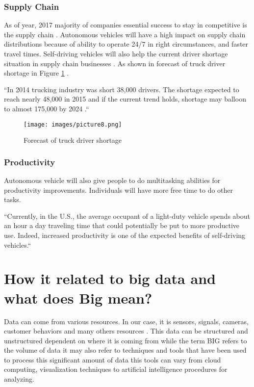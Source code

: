 \documentclass[sigconf]{acmart}
\begin{document}
\subsubsection{Supply Chain} As of year, 2017 majority of companies essential success to stay in competitive is the supply chain \cite{ATA}.  Autonomous vehicles will have a high impact on supply chain distributions because of ability to operate 24/7 in right circumstances, and faster travel times. Self-driving vehicles will also help the current driver shortage situation in supply chain businesses \cite{ATA}. As shown in forecast of truck driver shortage in Figure \ref{fig:small} \cite{ATA}.

    ``In 2014 trucking industry was short 38,000 drivers. The shortage expected to reach nearly 48,000 in 2015 and if the current trend holds, shortage may balloon to almost 175,000 by 2024 \cite{ATA}.``

\begin{figure}[!ht]
  \centering
      \texttt{[image: images/picture8.png]}
  \caption{Forecast of truck driver shortage}\label{fig:small}
\end{figure}

\subsubsection{Productivity}Autonomous vehicle will also give people to do multitasking abilities for productivity improvements. Individuals will have more free time to do other tasks. 

``Currently, in the U.S., the average occupant of a light-duty vehicle spends about an hour a day traveling time that could potentially be put to more productive use. Indeed, increased productivity is one of the expected benefits of self-driving vehicles\cite{michigan}.``



\section{How it related to big data and what does Big mean?}
\par Data can come from various resources. In our case, it is sensors, signals, cameras, customer behaviors and many others resources \cite{www-webo}. This data can be structured and unstructured dependent on where it is coming from while the term BIG refers to the volume of data it may also refer to techniques and tools that have been used to process this significant amount of data this tools can vary from cloud computing, visualization techniques to artificial intelligence procedures for analyzing\cite{www-webo}.
\end{document}
